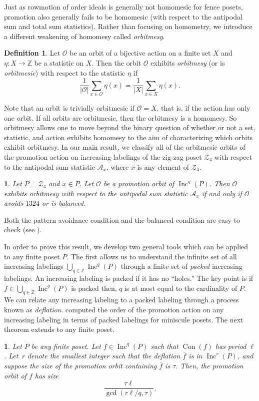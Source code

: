\documentclass[11pt]{amsart}
\newtheorem*{thma}{\Cref{thm:near-homomesy}}
\newtheorem*{thmb}{\Cref{thm:OrderComparedToDeflation}}
\theoremstyle{definition}
\newtheorem{definition}[theorem]{Definition}
\newcommand{\as}{\mathcal{A}}
\DeclareMathOperator{\Inc}{\mathrm{Inc}}
\DeclareMathOperator{\Con}{\mathrm{Con}}
\newcommand{\calZ}{\mathcal{Z}}
\newcommand{\orbmesic}{orbitmesic}
\begin{document}
Just as rowmotion of order ideals is generally not homomesic for fence posets, promotion also generally fails to be homomesic (with respect to the antipodal sum and total sum statistics).
Rather than focusing on homometry, we introduce a different weakening of homomesy called \emph{orbitmesy}.

\begin{definition}
\label{def:orbitmesy}
Let $\mathcal{O}$ be an orbit of a bijective action on a finite set $X$ and $\eta:X\rightarrow \mathbb{Z}$ be a statistic on $X$. Then the orbit $\mathcal{O}$ exhibits \emph{orbitmesy} (or is \emph{orbitmesic}) with respect to the statistic $\eta$ if 
\[\dfrac{1}{|\mathcal{O}|}\displaystyle\sum_{x\in \mathcal{O}}\eta(x)=\dfrac{1}{|X|}\displaystyle\sum_{x\in X}\eta(x).\]  
\end{definition}
Note that an orbit is trivially orbitmesic if $\mathcal{O}=X$, that is, if the action has only one orbit.
If all orbits are \orbmesic, then the orbitmesy is a homomesy. 
So orbitmesy allows one to move beyond the binary question of whether or not a set, statistic, and action exhibits homomesy to the aim of characterizing which orbits exhibit orbitmesy.
In our main result, we classify all of the orbitmesic orbits of the promotion action on increasing labelings of the zig-zag poset $\mathcal{Z}_4$ with respect to the antipodal sum statistic $\mathcal{A}_x$, where $x$ is any element of $\mathcal{Z}_4$.

\begin{thma}
    Let $P=\calZ_4$ and $x\in P$. Let $\mathcal{O}$ be a promotion orbit of $\Inc^q(P)$. Then $\mathcal{O}$ exhibits orbitmesy with respect to the antipodal sum statistic $\as_x$ if and only if $\mathcal{O}$ avoids $1324$ or is balanced.
\end{thma}
\noindent
Both the pattern avoidance condition and the balanced condition are easy to check (see ).

In order to prove this result, we develop two general tools which can be applied to any finite poset $P$.  The first allows us to understand the infinite set of all increasing labelings $\bigcup_{q\in\mathbb{Z}} \Inc^q(P)$ through a finite set of \emph{packed} increasing labelings.  An increasing labeling is packed if it has no ``holes."  The key point is if $f\in \bigcup_{q\in\mathbb{Z}} \Inc^q(P)$ is packed then, $q$ is at most equal to the cardinality of $P$.  We can relate any increasing labeling to a packed labeling through a process known as \emph{deflation}.
\cite[Theorem 6.1]{mandel2018orbits} computed the order of the promotion action on any increasing labeling in terms of packed labelings for miniscule posets.
The next theorem extends \cite[Theorem 6.1]{mandel2018orbits} to any finite poset.
\begin{thmb}
Let $P$ be any finite poset.
Let $f \in \Inc^q(P)$ such that $\Con(f)$ has period $\ell$. Let~$r$ denote the smallest integer such that the deflation $\overline{f}$ is in $\Inc^r(P)$, and suppose the size of the promotion orbit containing $\overline{f}$ is $\tau$. Then, the promotion orbit of $f$ has size \[
\frac{\tau \ell}{\gcd(r\ell/q,\tau)}.
\]
\end{thmb}
\end{document}
